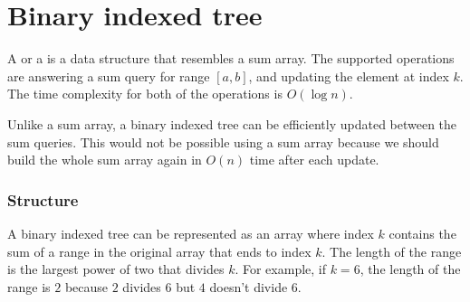 \section{Binary indexed tree}


A  or a 
is a data structure that resembles a sum array.
The supported operations are answering
a sum query for range $[a,b]$,
and updating the element at index $k$.
The time complexity for both of the operations is $O(\log n)$.

Unlike a sum array, a binary indexed tree
can be efficiently updated between the sum queries.
This would not be possible using a sum array
because we should build the whole sum array again
in $O(n)$ time after each update.

\subsubsection{Structure}

A binary indexed tree can be represented as an array
where index $k$ contains the sum of a range in the
original array that ends to index $k$.
The length of the range is the largest power of two
that divides $k$.
For example, if $k=6$, the length of the range is $2$
because $2$ divides $6$ but $4$ doesn't divide $6$.

